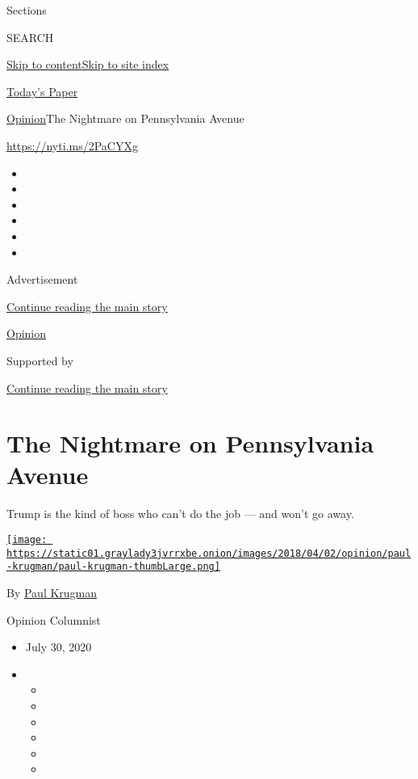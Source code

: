 Sections

SEARCH

\protect\hyperlink{site-content}{Skip to
content}\protect\hyperlink{site-index}{Skip to site index}

\href{https://myaccount.nytimes3xbfgragh.onion/auth/login?response_type=cookie\&client_id=vi}{}

\href{https://www.nytimes3xbfgragh.onion/section/todayspaper}{Today's
Paper}

\href{/section/opinion}{Opinion}\textbar{}The Nightmare on Pennsylvania
Avenue

\url{https://nyti.ms/2PaCYXg}

\begin{itemize}
\item
\item
\item
\item
\item
\item
\end{itemize}

Advertisement

\protect\hyperlink{after-top}{Continue reading the main story}

\href{/section/opinion}{Opinion}

Supported by

\protect\hyperlink{after-sponsor}{Continue reading the main story}

\hypertarget{the-nightmare-on-pennsylvania-avenue}{%
\section{The Nightmare on Pennsylvania
Avenue}\label{the-nightmare-on-pennsylvania-avenue}}

Trump is the kind of boss who can't do the job --- and won't go away.

\href{https://www.nytimes3xbfgragh.onion/by/paul-krugman}{\texttt{[image: https://static01.graylady3jvrrxbe.onion/images/2018/04/02/opinion/paul-krugman/paul-krugman-thumbLarge.png]}}

By \href{https://www.nytimes3xbfgragh.onion/by/paul-krugman}{Paul
Krugman}

Opinion Columnist

\begin{itemize}
\item
  July 30, 2020
\item
  \begin{itemize}
  \item
  \item
  \item
  \item
  \item
  \item
  \end{itemize}
\end{itemize}

